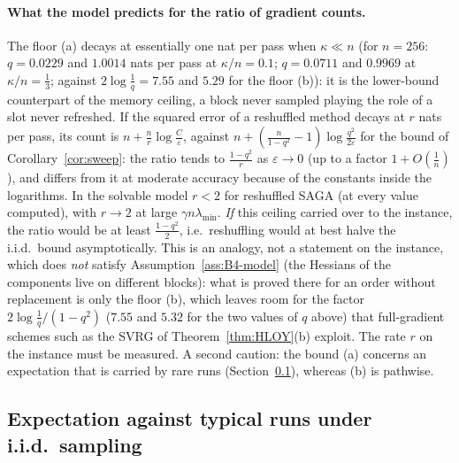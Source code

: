 \paragraph{What the model predicts for the ratio of gradient counts.}
The floor (a) decays at essentially one nat per pass when $\kappa\ll n$ (for $n=256$: $q=0.0229$ and $1.0014$ nats per pass at $\kappa/n=0.1$; $q=0.0711$ and $0.9969$ at $\kappa/n=\frac13$; against $2\log\frac1q=7.55$ and $5.29$ for the floor (b)): it is the lower-bound counterpart of the memory ceiling, a block never sampled playing the role of a slot never refreshed. If the squared error of a reshuffled method decays at $r$ nats per pass, its count is $n+\frac nr\log\frac C\varepsilon$, against $n+(\frac n{1-q^2}-1)\log\frac{q^2}{2\varepsilon}$ for the bound of Corollary~\ref{cor:sweep}: the ratio tends to $\frac{1-q^2}r$ as $\varepsilon\to0$ (up to a factor $1+O(\frac1n)$), and differs from it at moderate accuracy because of the constants inside the logarithms. In the solvable model $r<2$ for reshuffled SAGA (at every value computed), with $r\to2$ at large $\gamma n\lambda_{\min}$. \emph{If} this ceiling carried over to the instance, the ratio would be at least $\frac{1-q^2}2$, i.e.\ reshuffling would at best halve the i.i.d.\ bound asymptotically. This is an analogy, not a statement on the instance, which does \emph{not} satisfy Assumption~\ref{ass:B4-model} (the Hessians of the components live on different blocks): what is proved there for an order without replacement is only the floor (b), which leaves room for the factor $2\log\frac1q/(1-q^2)$ ($7.55$ and $5.32$ for the two values of $q$ above) that full-gradient schemes such as the SVRG of Theorem~\ref{thm:HLOY}(b) exploit. The rate $r$ on the instance must be measured. A second caution: the bound (a) concerns an expectation that is carried by rare runs (Section~\ref{sec:B4-typical}), whereas (b) is pathwise.

\subsection{Expectation against typical runs under i.i.d.\ sampling}\label{sec:B4-typical}

